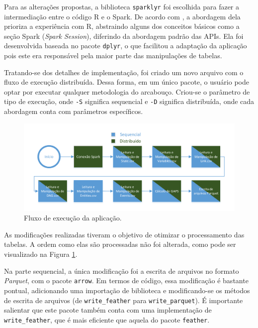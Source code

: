 Para as alterações propostas, a biblioteca \texttt{sparklyr} foi escolhida 
para fazer a intermediação entre o código R e o Spark. De acordo com \citet{}, 
a abordagem dela prioriza a experiência com R, abstraindo alguns dos conceitos 
básicos como a seção Spark (\emph{Spark Session}), diferindo da abordagem padrão 
das APIs. Ela foi desenvolvida baseada no pacote \texttt{dplyr}, o que facilitou 
a adaptação da aplicação pois este era responsável pela maior parte das 
manipulações de tabelas.

Tratando-se dos detalhes de implementação, foi criado um novo arquivo com o 
fluxo de execução distribuída. Dessa forma, em um único pacote, o usuário pode 
optar por executar qualquer metodologia do arcabouço. Criou-se o parâmetro de 
tipo de execução, onde \texttt{-S} significa sequencial e \texttt{-D} significa 
distribuída, onde cada abordagem conta com parâmetros específicos.

\begin{figure}[ht]
 \centerline{\includegraphics[width=1\textwidth]{./img/applicationflow.pdf}}
 \caption{Fluxo de execução da aplicação.}
 \label{fig:spark-starvz-flow}
\end{figure}

As modificações realizadas tiveram o objetivo de otimizar o processamento das 
tabelas. A ordem como elas são processadas não foi alterada, como pode ser 
visualizado na Figura \ref{fig:spark-starvz-flow}.

Na parte sequencial, a única modificação foi a escrita de arquivos no formato 
\emph{Parquet}, com o pacote \texttt{arrow}. Em termos de código, essa 
modificação é bastante pontual, adicionando uma importação de biblioteca e 
modificando-se os métodos de escrita de arquivos (de \texttt{write\_feather} 
para \texttt{write\_parquet}). É importante salientar que este pacote também 
conta com uma implementação de \texttt{write\_feather}, que é mais eficiente 
que aquela do pacote \texttt{feather}.

